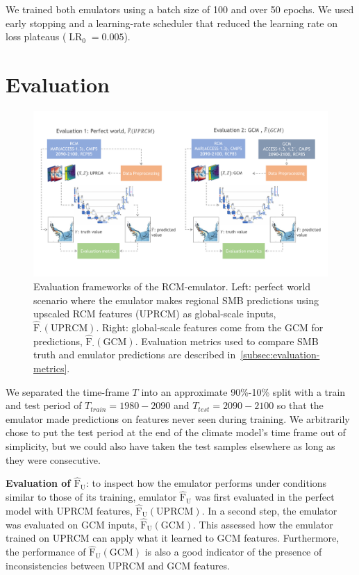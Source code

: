 \documentclass[a4paper,11pt,oneside]{report}
\begin{document}
We trained both emulators using a batch size of 100 and over 50 epochs. We used early stopping and a learning-rate scheduler that reduced the learning rate on loss plateaus ($\operatorname{LR}_0 = 0.005$). 

\section{Evaluation}\label{sec:evaluation}

\begin{figure}[!t]
  \centering
  \includegraphics[width=\columnwidth]{doc/Thesis-latex/images/evaluation_framework.pdf}
  \caption []{\small Evaluation frameworks of the RCM-emulator. Left: perfect world scenario where the emulator makes regional SMB predictions using upscaled RCM features (UPRCM) as global-scale inputs, $\mathrm{\hat{F}_{\cdot}(UPRCM)}$. Right: global-scale features come from the GCM for predictions, $\mathrm{\hat{F}_{\cdot}(GCM)}$. Evaluation metrics used to compare SMB truth and emulator predictions are described in~\autoref{subsec:evaluation-metrics}.}
  \vspace{-3mm}
  \label{fig:evaluation-framework}
\end{figure}

We separated the time-frame $T$ into an approximate 90\%-10\% split with a train and test period of $T_{train} = 1980-2090$ and $T_{test} = 2090-2100$ so that the emulator made predictions on features never seen during training. We arbitrarily chose to put the test period at the end of the climate model's time frame out of simplicity, but we could also have taken the test samples elsewhere as long as they were consecutive. 

\textbf{Evaluation of $\mathrm{\hat{F}_U}$}: to inspect how the emulator performs under conditions similar to those of its training, emulator $\mathrm{\hat{F}_U}$ was first evaluated in the perfect model with UPRCM features, $\mathrm{\hat{F}_U(UPRCM)}$. In a second step, the emulator was evaluated on GCM inputs, $\mathrm{\hat{F}_U(GCM)}$. This assessed how the emulator trained on UPRCM can apply what it learned to GCM features. Furthermore, the performance of $\mathrm{\hat{F}_U(GCM)}$ is also a good indicator of the presence of inconsistencies between UPRCM and GCM features. 
\end{document}
